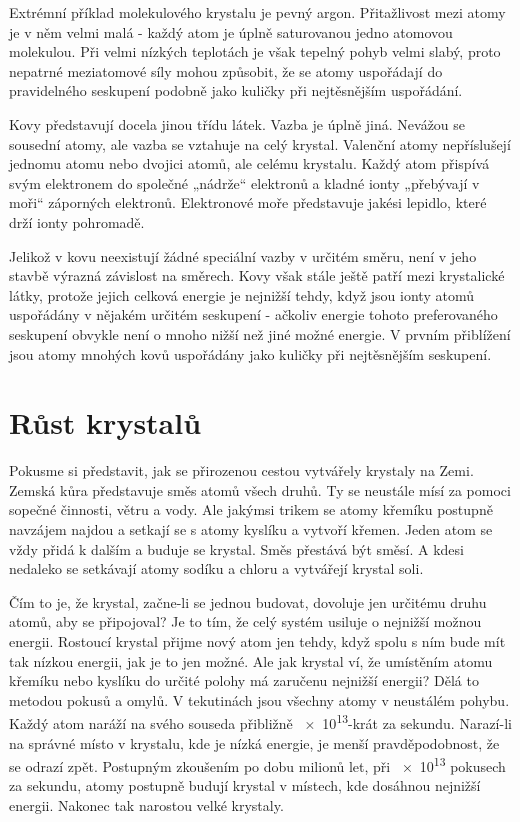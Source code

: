 {    Extrémní příklad molekulového krystalu je pevný argon. Přitažlivost mezi atomy je v něm velmi 
    malá - každý atom je úplně saturovanou jedno atomovou molekulou. Při velmi nízkých teplotách je 
    však tepelný pohyb velmi slabý, proto nepatrné meziatomové síly mohou způsobit, že se atomy 
    uspořádají do pravidelného seskupení podobně jako kuličky při nejtěsnějším uspořádání.
    
    Kovy představují docela jinou třídu látek. Vazba je úplně jiná. Nevážou se sousední atomy, ale 
    vazba se vztahuje na celý krystal. Valenční atomy nepříslušejí jednomu atomu nebo dvojici 
    atomů, ale celému krystalu. Každý atom přispívá svým elektronem do společné „nádrže“ elektronů 
    a kladné ionty „přebývají v moři“ záporných elektronů. Elektronové moře představuje jakési 
    lepidlo, které drží ionty pohromadě.
    
    Jelikož v kovu neexistují žádné speciální vazby v určitém směru, není v jeho stavbě výrazná 
    závislost na směrech. Kovy však stále ještě patří mezi krystalické látky, protože jejich 
    celková energie je nejnižší tehdy, když jsou ionty atomů uspořádány v nějakém určitém seskupení 
    - ačkoliv energie tohoto preferovaného seskupení obvykle není o mnoho nižší než jiné možné 
    energie. V prvním přiblížení jsou atomy mnohých kovů uspořádány jako kuličky při nejtěsnějším 
    seskupení.
    
  \section{Růst krystalů}\label{fyz:IIchapXXXsecIII}
    Pokusme si představit, jak se přirozenou cestou vytvářely krystaly na Zemi. Zemská kůra 
    představuje směs atomů všech druhů. Ty se neustále mísí za pomoci sopečné činnosti, větru a 
    vody. Ale jakýmsi trikem se atomy křemíku postupně navzájem najdou a setkají se s atomy kyslíku 
    a vytvoří křemen. Jeden atom se vždy přidá k dalším a buduje se krystal. Směs přestává být 
    směsí. A kdesi nedaleko se setkávají atomy sodíku a chloru a vytvářejí krystal soli.
    
    Čím to je, že krystal, začne-li se jednou budovat, dovoluje jen určitému druhu atomů, aby se 
    připojoval? Je to tím, že celý systém usiluje o nejnižší možnou energii. Rostoucí krystal 
    přijme nový atom jen tehdy, když spolu s ním bude mít tak nízkou energii, jak je to jen možné. 
    Ale jak krystal ví, že umístěním atomu křemíku nebo kyslíku do určité polohy má zaručenu 
    nejnižší energii? Dělá to metodou pokusů a omylů. V tekutinách jsou všechny atomy v neustálém 
    pohybu. Každý atom naráží na svého souseda přibližně \num{e13}-krát za sekundu. Narazí-li na 
    správné místo v krystalu, kde je nízká energie, je menší pravděpodobnost, že se odrazí zpět. 
    Postupným zkoušením po dobu milionů let, při \num{e13} pokusech za sekundu, atomy postupně 
    budují krystal v místech, kde dosáhnou nejnižší energii. Nakonec tak narostou velké krystaly.
    
}
